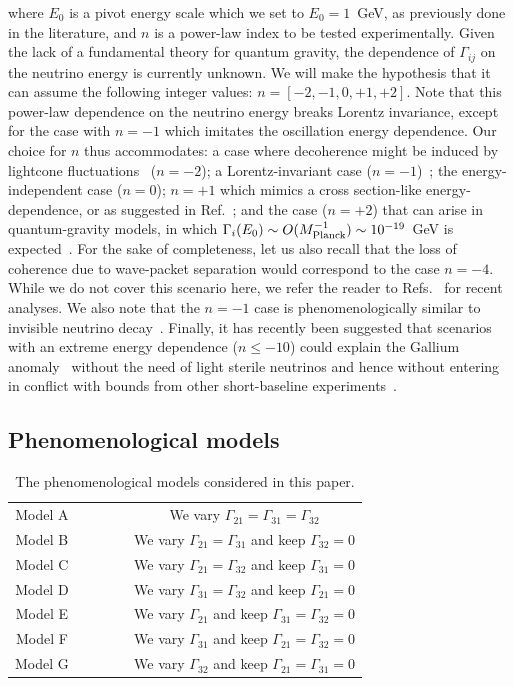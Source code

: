 \documentclass[aps, prd, onecolumn, tightenlines, notitlepage, superscriptaddress, nofootinbib, preprintnumbers, floatfix,showkeys,11pt]{revtex4-2}
\begin{document}
where $E_0$ is a pivot energy scale which we set to $E_0 = 1$~GeV, as previously done in the literature, and $n$ is a power-law index to be tested experimentally. Given the lack of a fundamental theory for quantum gravity, the dependence of $\Gamma_{ij}$ on the neutrino energy is currently unknown. We will make the hypothesis that it can assume the following integer values: $n = [-2, -1, 0, +1, +2]$. Note that this power-law dependence on the neutrino energy breaks Lorentz invariance, except for the case with $n = -1$ which imitates the oscillation energy dependence. 
Our choice for $n$ thus accommodates: a case where decoherence might be
induced by lightcone fluctuations~\cite{Stuttard:2021uyw} ($n=-2$); a Lorentz-invariant
case ($n= -1$)~\cite{Lisi:2000zt};
the energy-independent case ($n = 0$); $n = +1$ which mimics a cross section-like energy-dependence, or as suggested in Ref.~\cite{Liu:1997km}; and the case ($n=+2$) that can arise in quantum-gravity models, in which $\Gamma_i(E_0)\sim
O(M_{\rm Planck}^{-1})\sim 10^{-19}$~GeV is expected~\cite{Ellis:1995xd,Ellis:2000dy,Gambini:2003pv,Ellis:1996bz, Ellis:1997jw}. 
%
For the sake of completeness, let us also recall that the loss of coherence due to wave-packet separation would correspond to the case $n=-4$. While we do not cover this scenario here, we refer the reader to Refs.~\cite{deGouvea:2020hfl,deGouvea:2021uvg} for recent analyses. We also note that the $n=-1$ case is phenomenologically similar to invisible neutrino decay~\cite{Stuttard:2020qfv}. Finally, it has recently been suggested that scenarios with an extreme energy dependence ($n\leq-10$) could explain the Gallium anomaly~\cite{Farzan:2023fqa} without the need of light sterile neutrinos and hence without entering in conflict with bounds from other short-baseline experiments~\cite{Giunti:2022btk}.
 


\subsection{Phenomenological models}
\label{sec:models}

\begin{table}[!h]
\centering
\begin{tabular}{ c | c} 
\hline
Model A ~~~&~~~ We vary $\Gamma_{21}=\Gamma_{31}=\Gamma_{32}$\\
Model B ~~~&~~~ We vary $\Gamma_{21}=\Gamma_{31}$ and keep $\Gamma_{32}= 0$\\
Model C ~~~&~~~ We vary $\Gamma_{21}=\Gamma_{32}$ and keep $\Gamma_{31}= 0$\\
Model D ~~~&~~~ We vary $\Gamma_{31}=\Gamma_{32}$ and keep $\Gamma_{21}= 0$\\
Model E ~~~&~~~ We vary $\Gamma_{21}$ and keep $\Gamma_{31}=\Gamma_{32}= 0$\\
Model F ~~~&~~~ We vary $\Gamma_{31}$ and keep $\Gamma_{21}=\Gamma_{32}= 0$\\
Model G ~~~&~~~ We vary $\Gamma_{32}$ and keep $\Gamma_{21}=\Gamma_{31}= 0$
\\\hline
\end{tabular}
\caption{The phenomenological models considered in this paper.}
\label{tab:models}
\end{table} 
\end{document}
